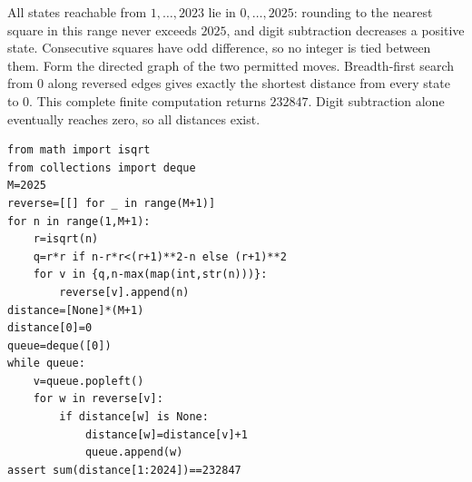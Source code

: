 All states reachable from $1,\ldots,2023$ lie in $0,\ldots,2025$: rounding to the nearest square in this range never exceeds $2025$, and digit subtraction decreases a positive state. Consecutive squares have odd difference, so no integer is tied between them. Form the directed graph of the two permitted moves. Breadth-first search from $0$ along reversed edges gives exactly the shortest distance from every state to $0$. This complete finite computation returns $\boxed{232847}$. Digit subtraction alone eventually reaches zero, so all distances exist.\begin{verbatim}
from math import isqrt
from collections import deque
M=2025
reverse=[[] for _ in range(M+1)]
for n in range(1,M+1):
    r=isqrt(n)
    q=r*r if n-r*r<(r+1)**2-n else (r+1)**2
    for v in {q,n-max(map(int,str(n)))}:
        reverse[v].append(n)
distance=[None]*(M+1)
distance[0]=0
queue=deque([0])
while queue:
    v=queue.popleft()
    for w in reverse[v]:
        if distance[w] is None:
            distance[w]=distance[v]+1
            queue.append(w)
assert sum(distance[1:2024])==232847
\end{verbatim}
